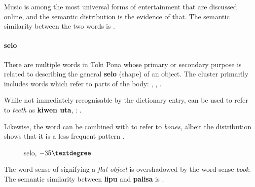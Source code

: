 \documentclass[14pt, a4paper]{extreport}
\makeatletter
\DeclareRobustCommand\ttfamily
        {\not@math@alphabet\ttfamily\mathtt
         \fontfamily\ttdefault\small\selectfont}
\makeatother
\begin{document}
Music is among the most universal forms of entertainment that are discussed online, and the semantic distribution is the evidence of that. The semantic similarity between the two words is .
        \paragraph{selo}
There are multiple words in Toki Pona whose primary or secondary purpose is related to describing the general \textbf{selo} (shape) of an object. The cluster primarily includes words which refer to parts of the body: , , .

While not immediately recognisable by the dictionary entry,  can be used to refer to \textit{teeth} as \textbf{kiwen uta}, : .

Likewise, the word  can be combined with  to refer to \textit{bones}, albeit the distribution shows that it is a less frequent pattern .

\begin{figure}[ht]%
  \def\angle{-35}
  \bigskip
  \centering
  \caption{selo, \(\angle\textdegree\)}
\end{figure}%

The word sense of  signifying a \textit{flat object} is overshadowed by the word sense \textit{book}. The semantic similarity between \textbf{lipu} and \textbf{palisa} is .
\end{document}
